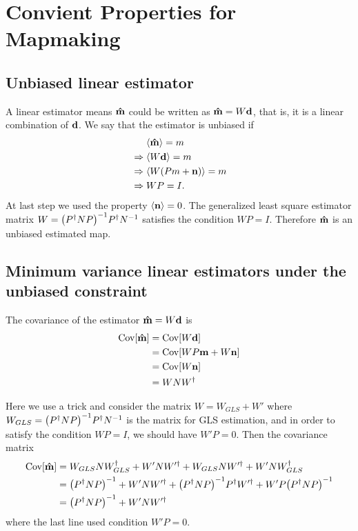 \documentclass[11pt, letterpaper]{article}
\newcommand{\Cov}[1]{\text{Cov}\qty[#1]}
\newcommand{\vbd}{\vb{d}}
\newcommand{\vbm}{\vb{m}}
\newcommand{\vbn}{\vb{n}}
\newcommand{\inv}[1]{#1^{-1}}
\newcommand{\hatm}{\vb{\hat{m}}}
\newcommand{\Pdagger}{P^{\dagger}}
\newcommand{\PPinv}[1]{\inv{\qty(\Pdagger #1 P)}}
\begin{document}
\section{Convient Properties for Mapmaking}

\subsection{Unbiased linear estimator}
A linear estimator means $\hatm$ could be written as $\hatm = W\vbd$, that is, 
it is a linear combination of $\vbd$.
We say that the estimator is unbiased if
\begin{align}
\begin{aligned}[b]
&\mathrel{\phantom{\Rightarrow}}\ev{\hatm} = m \\
&\Rightarrow\ev{W \vbd} = m\\
&\Rightarrow\ev{W(Pm + \vbn) } = m \\
&\Rightarrow WP = I.
\end{aligned}
\end{align}
At last step we used the property  $\ev{\vbn} = 0$.
The generalized least square estimator matrix 
$W = \PPinv{N} \Pdagger \inv{N}  $ satisfies the condition $WP=I$.
Therefore $\hatm$ is an unbiased estimated map.


\subsection{Minimum variance linear estimators under the unbiased constraint} \label{minimize variance}
The covariance of the estimator $\hatm = W \vbd$ is
\begin{align}
\begin{aligned}[b]
\Cov{\hatm} &= \Cov{W\vbd} 
\\ 
&= \Cov{WP\vbm + W\vbn} 
\\ 
&= \Cov{W\vbn} 
\\ 
&= W N W^{\dagger} \label{covariance hatm}
\end{aligned}
\end{align}

Here we use a trick \cite{weighted_and_GLS} and consider the matrix $W = W_{GLS} + W'$ where
$W_{GLS} = \PPinv{N} \Pdagger \inv{N} $ is the matrix for GLS estimation,
and in order to satisfy the condition $WP = I$, we should have $W'P = 0$.
Then the covariance matrix
\begin{align}
\begin{aligned}[b]
\Cov{\hatm }
&= W_{GLS} N W_{GLS}^{\dagger} + W' N W'^{\dagger} 
    + W_{GLS} N W'^{\dagger} + W' N W_{GLS}^{\dagger}
\\
&= \PPinv{N} + W' N W'^{\dagger} 
    + \PPinv{N} \Pdagger W'^{\dagger} + W' P \PPinv{N}
\\
&= \PPinv{N} + W' N W'^{\dagger} 
\end{aligned}
\end{align}
where the last line used condition $W'  P = 0$.
\end{document}
